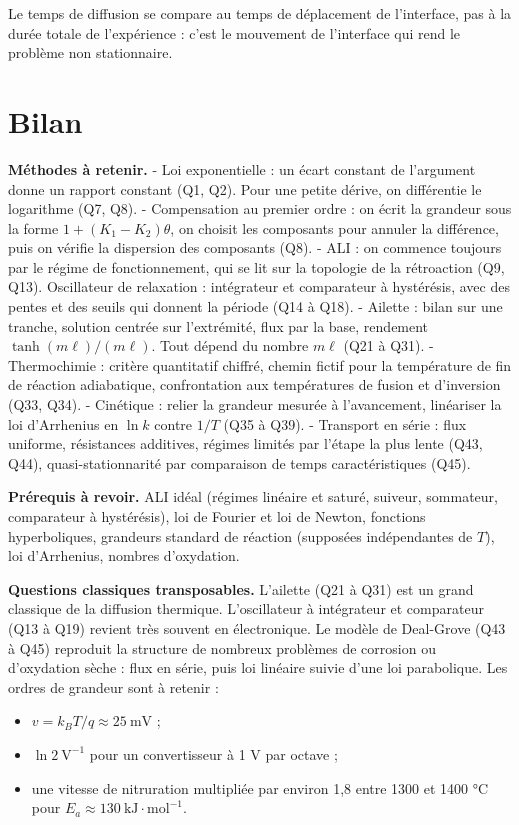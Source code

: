 \documentclass[11pt,a4paper]{article}
\providecommand{\tightlist}{\setlength{\itemsep}{0pt}\setlength{\parskip}{0pt}}
\begin{document}
\begin{piege}

Le temps de diffusion se compare au temps de déplacement de l'interface, pas à la durée totale de l'expérience : c'est le mouvement de l'interface qui rend le problème non stationnaire.

\end{piege}

\hypertarget{bilan}{%
\section{Bilan}\label{bilan}}

\textbf{Méthodes à retenir.}
- Loi exponentielle : un écart constant de l'argument donne un rapport constant (Q1, Q2). Pour une petite dérive, on différentie le logarithme (Q7, Q8).
- Compensation au premier ordre : on écrit la grandeur sous la forme \(1+(K_1-K_2)\theta\), on choisit les composants pour annuler la différence, puis on vérifie la dispersion des composants (Q8).
- ALI : on commence toujours par le régime de fonctionnement, qui se lit sur la topologie de la rétroaction (Q9, Q13). Oscillateur de relaxation : intégrateur et comparateur à hystérésis, avec des pentes et des seuils qui donnent la période (Q14 à Q18).
- Ailette : bilan sur une tranche, solution centrée sur l'extrémité, flux par la base, rendement \(\tanh(m\ell)/(m\ell)\). Tout dépend du nombre \(m\ell\) (Q21 à Q31).
- Thermochimie : critère quantitatif chiffré, chemin fictif pour la température de fin de réaction adiabatique, confrontation aux températures de fusion et d'inversion (Q33, Q34).
- Cinétique : relier la grandeur mesurée à l'avancement, linéariser la loi d'Arrhenius en \(\ln k\) contre \(1/T\) (Q35 à Q39).
- Transport en série : flux uniforme, résistances additives, régimes limités par l'étape la plus lente (Q43, Q44), quasi-stationnarité par comparaison de temps caractéristiques (Q45).

\textbf{Prérequis à revoir.} ALI idéal (régimes linéaire et saturé, suiveur, sommateur, comparateur à hystérésis), loi de Fourier et loi de Newton, fonctions hyperboliques, grandeurs standard de réaction (supposées indépendantes de \(T\)), loi d'Arrhenius, nombres d'oxydation.

\textbf{Questions classiques transposables.} L'ailette (Q21 à Q31) est un grand classique de la diffusion thermique. L'oscillateur à intégrateur et comparateur (Q13 à Q19) revient très souvent en électronique. Le modèle de Deal-Grove (Q43 à Q45) reproduit la structure de nombreux problèmes de corrosion ou d'oxydation sèche : flux en série, puis loi linéaire suivie d'une loi parabolique. Les ordres de grandeur sont à retenir :

\begin{itemize}
\tightlist
\item
  \(v=k_BT/q\approx25\ \mathrm{mV}\) ;
\item
  \(\ln2\ \mathrm{V^{-1}}\) pour un convertisseur à 1 V par octave ;
\item
  une vitesse de nitruration multipliée par environ 1,8 entre 1300 et 1400 °C pour \(E_a\approx130\ \mathrm{kJ\cdot mol^{-1}}\).
\end{itemize}
\end{document}
